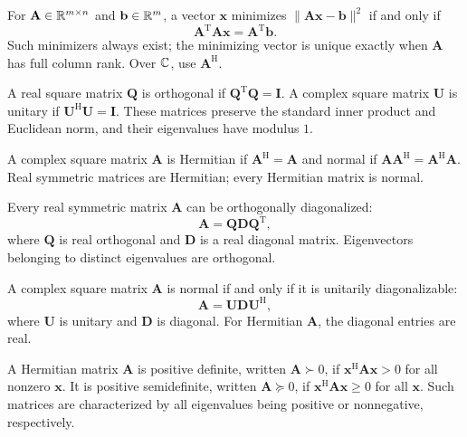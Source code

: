 \begin{theorem}
For $\mathbf{A}\in\mathbb{R}^{m\times n}$ and $\mathbf{b}\in\mathbb{R}^m$, a vector $\mathbf{x}$ minimizes $\|\mathbf{A}\mathbf{x}-\mathbf{b}\|^2$ if and only if
\[
 \mathbf{A}^{\mathrm{T}}\mathbf{A}\mathbf{x}=\mathbf{A}^{\mathrm{T}}\mathbf{b}.
\]
Such minimizers always exist; the minimizing vector is unique exactly when $\mathbf{A}$ has full column rank. Over $\mathbb{C}$, use $\mathbf{A}^{\mathrm{H}}$.
\end{theorem}

\begin{definition}
A real square matrix $\mathbf{Q}$ is orthogonal if $\mathbf{Q}^{\mathrm{T}}\mathbf{Q}=\mathbf{I}$. A complex square matrix $\mathbf{U}$ is unitary if $\mathbf{U}^{\mathrm{H}}\mathbf{U}=\mathbf{I}$. These matrices preserve the standard inner product and Euclidean norm, and their eigenvalues have modulus $1$.
\end{definition}

\begin{definition}
A complex square matrix $\mathbf{A}$ is Hermitian if $\mathbf{A}^{\mathrm{H}}=\mathbf{A}$ and normal if $\mathbf{A}\mathbf{A}^{\mathrm{H}}=\mathbf{A}^{\mathrm{H}}\mathbf{A}$. Real symmetric matrices are Hermitian; every Hermitian matrix is normal.
\end{definition}

\begin{theorem}
Every real symmetric matrix $\mathbf{A}$ can be orthogonally diagonalized:
\[
 \mathbf{A}=\mathbf{Q}\mathbf{D}\mathbf{Q}^{\mathrm{T}},
\]
where $\mathbf{Q}$ is real orthogonal and $\mathbf{D}$ is a real diagonal matrix. Eigenvectors belonging to distinct eigenvalues are orthogonal.
\end{theorem}

\begin{theorem}
A complex square matrix $\mathbf{A}$ is normal if and only if it is unitarily diagonalizable:
\[
 \mathbf{A}=\mathbf{U}\mathbf{D}\mathbf{U}^{\mathrm{H}},
\]
where $\mathbf{U}$ is unitary and $\mathbf{D}$ is diagonal. For Hermitian $\mathbf{A}$, the diagonal entries are real.
\end{theorem}

\begin{definition}
A Hermitian matrix $\mathbf{A}$ is positive definite, written $\mathbf{A}\succ0$, if $\mathbf{x}^{\mathrm{H}}\mathbf{A}\mathbf{x}>0$ for all nonzero $\mathbf{x}$. It is positive semidefinite, written $\mathbf{A}\succeq0$, if $\mathbf{x}^{\mathrm{H}}\mathbf{A}\mathbf{x}\ge0$ for all $\mathbf{x}$. Such matrices are characterized by all eigenvalues being positive or nonnegative, respectively.
\end{definition}

